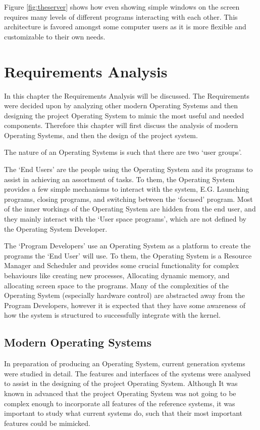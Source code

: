 \documentclass[a4paper]{report}
\begin{document}
Figure \ref{fig:theserver} shows how even showing simple windows on the screen requires many levels of different programs interacting with each other. This architecture is favored amongst some computer users as it is more flexible and customizable to their own needs.

\chapter{Requirements Analysis}

In this chapter the Requirements Analysis will be discussed. The Requirements were decided upon by analyzing other modern Operating Systems and then designing the project Operating System to mimic the most useful and needed components. Therefore this chapter will first discuss the analysis of modern Operating Systems, and then the design of the project system.


The nature of an Operating Systems is such that there are two `user groups'.


The `End Users' are the people using the Operating System and its programs to assist in achieving an assortment of tasks. To them, the Operating System provides a few simple mechanisms to interact with the system, E.G. Launching programs, closing programs, and switching between the `focused' program. Most of the inner workings of the Operating System are hidden from the end user, and they mainly interact with the `User space programs', which are not defined by the Operating System Developer.


The `Program Developers' use an Operating System as a platform to create the programs the `End User' will use. To them, the Operating System is a Resource Manager and Scheduler and provides some crucial functionality for complex behaviours like creating new processes, Allocating dynamic memory, and allocating screen space to the programs. Many of the complexities of the Operating System (especially hardware control) are abstracted away from the Program Developers, however it is expected that they have some awareness of how the system is structured to successfully integrate with the kernel.


\clearpage
\section{Modern Operating Systems}

In preparation of producing an Operating System, current generation systems were studied in detail. The features and interfaces of the systems were analysed to assist in the designing of the project Operating System. Although It was known in advanced that the project Operating System was not going to be complex enough to incorporate all features of the reference systems, it was important to study what current systems do, such that their most important features could be mimicked.
\end{document}
